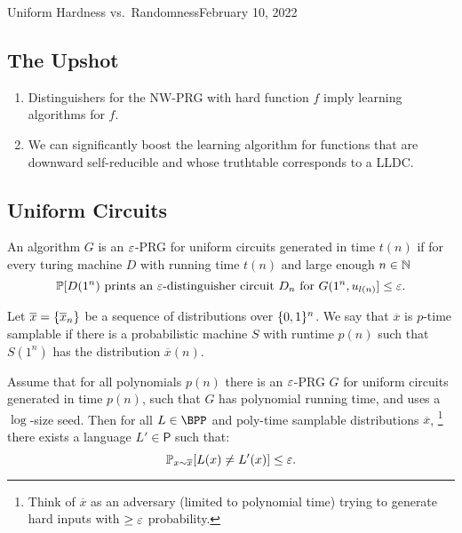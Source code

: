 \begin{lecture}{4}{Uniform Hardness vs.\ Randomness}{February 10, 2022}
\label{lec:04}

\subsection*{The Upshot}

\begin{enumerate}
  \item Distinguishers for the NW-PRG with hard function $f$ imply learning
    algorithms for $f$.
  \item We can significantly boost the learning algorithm for functions that
    are downward self-reducible and whose truthtable corresponds to a LLDC.
\end{enumerate}


\subsection{Uniform Circuits}

\begin{definition}
	An algorithm $G$ is an $\varepsilon$-PRG for uniform circuits generated in time
	$t(n)$ if for every turing machine $D$ with running time $t(n)$ and
	large enough $n \in \mathbb{N}$
	\[
		\mathbb{P}[D(1^n) \text{ prints an } \varepsilon\text{-distinguisher circuit }
		D_n \text{ for } G(1^n, u_{l(n)}] \leq \varepsilon.
	\]
\end{definition}

\begin{definition}
	Let $\overline{x} = \{\overline{x}_n\}$ be a sequence of distributions
	over $\{0, 1\}^n$. We say that $\overline{x}$ is $p$-time samplable
	if there is a probabilistic machine $S$ with runtime $p(n)$ such that
	$S(1^n)$ has the distribution $\overline{x}(n)$.
\end{definition}

\begin{theorem}
	Assume that for all polynomials $p(n)$ there is an $\varepsilon$-PRG $G$ for
	uniform circuits generated in time $p(n)$, such that $G$ has polynomial
	running time, and uses a $\log$-size seed. Then for all
	$L \in \BPP$ and poly-time samplable distributions $\overline{x}$,%
	\footnote{Think of $\overline{x}$ as an adversary (limited to polynomial
	time) trying to generate hard inputs with $\geq \varepsilon$ probability.}
	there exists a language $L' \in \textsf{P}$ such that:
	\[
		\mathbb{P}_{x \sim \overline{x}}[L(x) \neq L'(x)] \leq \varepsilon.
	\]
\end{theorem}


\end{lecture}
